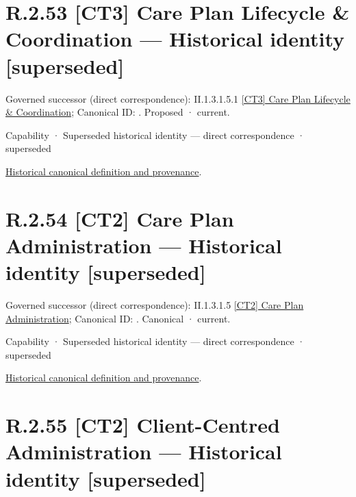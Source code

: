 \section*{R.2.53 [CT3] Care Plan Lifecycle \& Coordination — Historical identity [superseded]}
\label{navigation:R.2.53}

{\small Governed successor (direct correspondence): II.1.3.1.5.1 \hyperref[element:4cb7db65392f4fab801d7794af4d4b29]{[CT3] Care Plan Lifecycle \& Coordination}; Canonical ID: \texttt{}. Proposed · current.}\par
\label{element:689bb3f8a24249b79f787e1f48eb268d}
{\small Capability · Superseded historical identity — direct correspondence · superseded}\par
\href{../../../../continuum/strategy/capability/689bb3f8a24249b79f787e1f48eb268d.md}{Historical canonical definition and provenance}.\par
\section*{R.2.54 [CT2] Care Plan Administration — Historical identity [superseded]}
\label{navigation:R.2.54}

{\small Governed successor (direct correspondence): II.1.3.1.5 \hyperref[element:cf06eec5699f406fa30a00d2f76e3098]{[CT2] Care Plan Administration}; Canonical ID: \texttt{}. Canonical · current.}\par
\label{element:e31407cea7624632a8ed2dc53b09d726}
{\small Capability · Superseded historical identity — direct correspondence · superseded}\par
\href{../../../../continuum/strategy/capability/e31407cea7624632a8ed2dc53b09d726.md}{Historical canonical definition and provenance}.\par
\section*{R.2.55 [CT2] Client-Centred Administration — Historical identity [superseded]}
\label{navigation:R.2.55}

